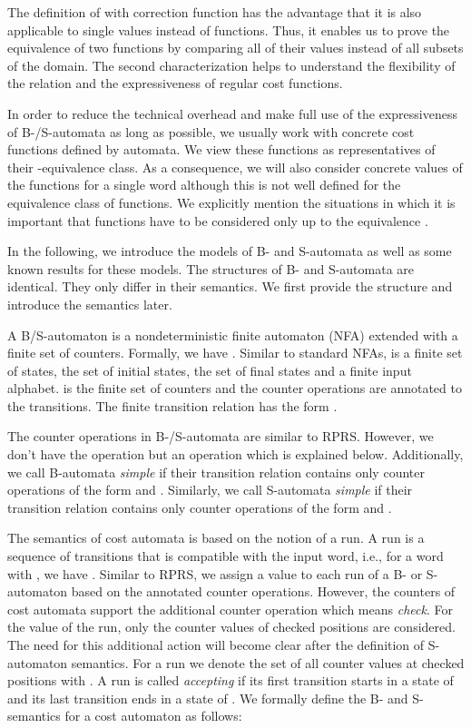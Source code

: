 \documentclass{LMCS}
\newcommand{\RPRS}{\textsf{RPRS}}
\begin{document}
The definition of  with correction function has the
advantage that it is also applicable to single values instead of functions.
Thus, it enables us to prove the equivalence of two functions by comparing all
of their values instead of all subsets of the domain. The second
characterization helps to understand the flexibility of the relation
 and the expressiveness of regular cost functions. 

In order to
reduce the technical overhead and make full use of the expressiveness of 
B-/S-automata as long as possible, we usually work with concrete cost functions 
defined by automata. We view these functions as representatives of their 
-equivalence class. As a consequence, we will also consider
concrete values of the functions for a single word although this is not
well defined for the equivalence class of functions. We explicitly mention the
situations in which it is important that functions have to be considered
only up to the equivalence .

In the following, we introduce the models of B- and S-automata as well as some
known results for these models. The structures of B- and S-automata are identical.
They only differ in their semantics. We first provide the structure and
introduce the semantics later.

\begin{defi}
A B/S-automaton is a nondeterministic finite automaton (NFA) extended with a
finite set of counters. Formally, we have .
Similar to standard NFAs,  is a finite set of states,  the set of
initial states,  the set of final states and  a finite input
alphabet.  is the finite set of counters and the counter operations 
are annotated to the transitions. The finite transition relation has the 
form .
\end{defi}

The counter operations in B-/S-automata are similar to \RPRS{}. However,
we don't have the operation  but an operation  which is explained 
below. Additionally, we call B-automata \emph{simple} if
their transition relation contains only counter operations of the form 
 and . Similarly, we call S-automata \emph{simple} if their transition
relation contains only counter operations of the form  and .

The semantics of cost automata is based on the notion of a run. A run is 
a sequence  of transitions that is
compatible with the input word, i.e., for a word 
with , we have .
Similar to \RPRS{}, we
assign a value to each run of a B- or S-automaton based on the annotated counter
operations. However, the counters of cost automata support the additional 
counter operation which means \emph{check}. For the value of the run, only the
counter values of checked positions are considered. The need for this additional
action will become clear after the definition of S-automaton semantics. 
For a run  we denote the set of all counter values at checked positions 
with . A run is called \emph{accepting} if its first transition
starts in a state of  and its last transition ends in a state of .
We formally define the B- and S-semantics for a cost automaton 
as follows:
\end{document}
